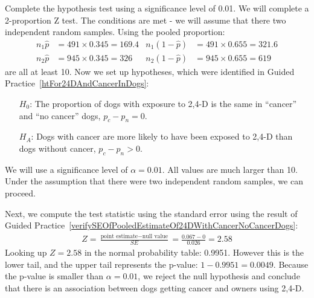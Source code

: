 \begin{example}{Complete the hypothesis test using a significance level of 0.01.}
We will complete a 2-proportion Z test. The conditions are met  - we will assume that there two independent random samples. Using the pooled proportion:
\begin{align*}
n_1\hat{p} &= 491 \times 0.345 = 169.4
	& n_1(1 - \hat{p}) &= 491 \times 0.655 = 321.6 \\
n_2\hat{p} &= 945 \times 0.345 = 326
	& n_2(1 - \hat{p}) &= 945 \times 0.655 = 619
\end{align*}
are all at least 10. Now we set up hypotheses, which were identified in Guided Practice~\ref{htFor24DAndCancerInDogs}:
\begin{itemize}
\item[$H_0$:] The proportion of dogs with exposure to 2,4-D is the same in ``cancer'' and ``no cancer'' dogs, $p_c - p_n = 0$.
\item[$H_A$:] Dogs with cancer are more likely to have been exposed to 2,4-D than dogs without cancer, $p_c - p_n > 0$.
\end{itemize}
We will use a significance level of $\alpha = 0.01$. All values are much larger than 10. Under the assumption that there were two independent random samples, we can proceed.

Next, we compute the test statistic using the standard error using the result of Guided Practice~\ref{verifySEOfPooledEstimateOf24DWithCancerNoCancerDogs}:
\begin{eqnarray*}
Z = \frac{\text{point estimate} - \text{null value}}{SE} = \frac{0.067 - 0}{0.026} = 2.58
\end{eqnarray*}
Looking up $Z=2.58$ in the normal probability table: 0.9951. However this is the lower tail, and the upper tail represents the p-value: $1-0.9951 = 0.0049$. Because the p-value is smaller than $\alpha = 0.01$, we reject the null hypothesis and conclude that there is an association between dogs getting cancer and owners using 2,4-D.
\end{example}
 
